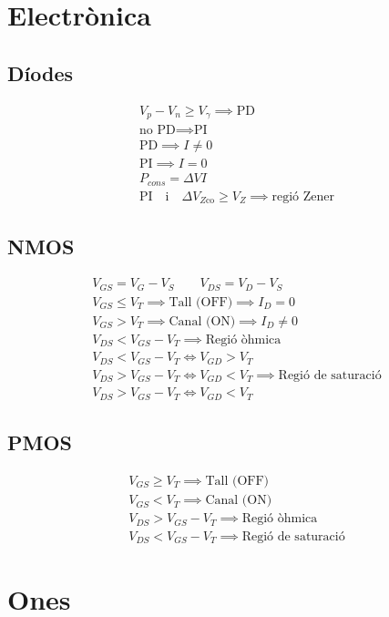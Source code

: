 \documentclass[10pt,twocolumn]{article}
\begin{document}
\section{Electrònica}
\subsection{Díodes}
\begin{gather*}
V_p - V_n \geq V_\gamma \implies \text{PD} \\
\text{no PD} \implies \text{PI} \\
\text{PD} \implies I \neq 0 \\
\text{PI} \implies I = 0 \\
P_{cons} = \Delta V I \\
\text{PI} \quad \text{i} \quad \Delta V_{Z \text{co}} \geq V_Z \implies \text{regió Zener}
\end{gather*}
\subsection{NMOS}
\begin{gather*}
V_{GS} = V_G - V_S \qquad V_{DS} = V_D - V_S \\
V_{GS} \leq V_T \implies \text{Tall (OFF)} \implies I_D = 0 \\
V_{GS} > V_T \implies \text{Canal (ON)} \implies I_D \neq 0  \\
V_{DS} < V_{GS} - V_T \implies \text{Regió òhmica} \\
V_{DS} < V_{GS} - V_T \iff V_{GD} > V_T \\
V_{DS} > V_{GS} - V_T \iff V_{GD} < V_T \implies \text{Regió de saturació} \\
V_{DS} > V_{GS} - V_T \iff V_{GD} < V_T
\end{gather*}
\subsection{PMOS}
\begin{gather*}
    V_{GS} \geq V_T \implies \text{Tall (OFF)} \\
    V_{GS} < V_T \implies \text{Canal (ON)} \\
    V_{DS} > V_{GS} - V_T \implies \text{Regió òhmica} \\
    V_{DS} < V_{GS} - V_T \implies \text{Regió de saturació}
\end{gather*}
\section{Ones}
\end{document}
